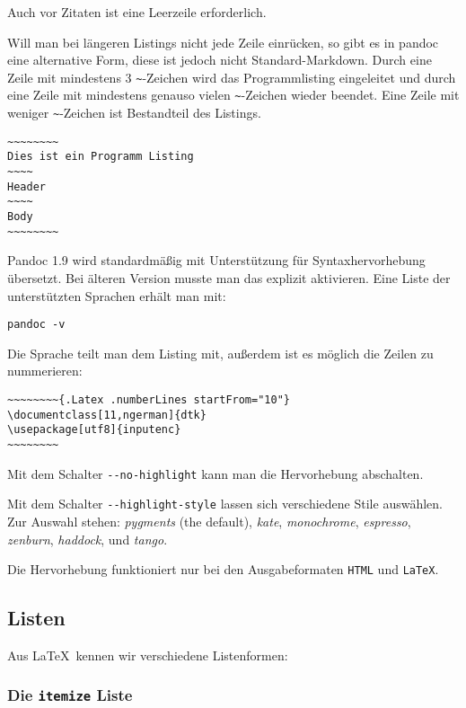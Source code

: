 \documentclass[11pt,ngerman,a4paper]{article}
\begin{document}
Auch vor Zitaten ist eine Leerzeile erforderlich.

Will man bei längeren Listings nicht jede Zeile einrücken, so gibt es in
pandoc eine alternative Form, diese ist jedoch nicht Standard-Markdown.
Durch eine Zeile mit mindestens 3 \texttt{\textasciitilde{}}-Zeichen
wird das Programmlisting eingeleitet und durch eine Zeile mit mindestens
genauso vielen \texttt{\textasciitilde{}}-Zeichen wieder beendet. Eine
Zeile mit weniger \texttt{\textasciitilde{}}-Zeichen ist Bestandteil des
Listings.

\begin{verbatim}
~~~~~~~~
Dies ist ein Programm Listing
~~~~
Header
~~~~
Body
~~~~~~~~
\end{verbatim}

Pandoc 1.9 wird standardmäßig mit Unterstützung für Syntaxhervorhebung
übersetzt. Bei älteren Version musste man das explizit aktivieren. Eine
Liste der unterstützten Sprachen erhält man mit:

\begin{verbatim}
pandoc -v
\end{verbatim}

Die Sprache teilt man dem Listing mit, außerdem ist es möglich die
Zeilen zu nummerieren:

\begin{verbatim}
~~~~~~~~{.Latex .numberLines startFrom="10"}
\documentclass[11,ngerman]{dtk}
\usepackage[utf8]{inputenc}
~~~~~~~~
\end{verbatim}

Mit dem Schalter \texttt{-{}-no-highlight} kann man die Hervorhebung
abschalten.

Mit dem Schalter \texttt{-{}-highlight-style} lassen sich verschiedene
Stile auswählen. Zur Auswahl stehen: \emph{pygments} (the default),
\emph{kate}, \emph{monochrome}, \emph{espresso}, \emph{zenburn},
\emph{haddock}, und \emph{tango}.

Die Hervorhebung funktioniert nur bei den Ausgabeformaten \texttt{HTML}
und \texttt{LaTeX}.

\subsection{Listen}\label{listen}

Aus LaTeX~kennen wir verschiedene Listenformen:

\subsubsection{Die \texttt{itemize} Liste}\label{die-itemize-liste}
\end{document}
